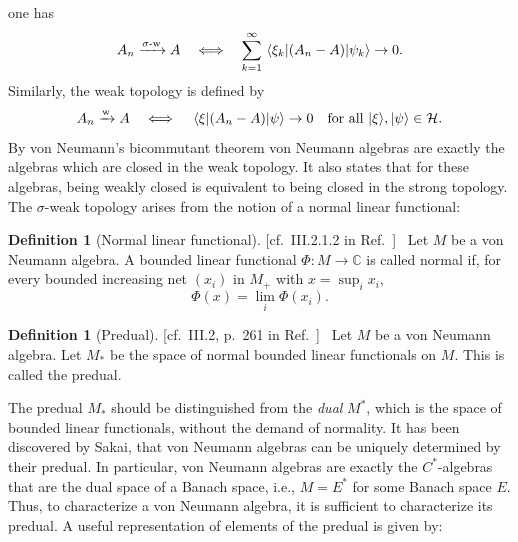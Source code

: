 \documentclass[aps,pra,reprint,superscriptaddress]{revtex4-2}
\newcommand{\cH}{{\mathcal H}}
\renewcommand\P{\Phi}
\newcommand\s{\sigma}
\newcommand\x{\xi}
\newcommand\y{\psi}
\providecommand{\ket}[1]{\lvert #1\rangle}
\newcommand{\thmref}[1]{\textnormal{[#1]}\ }
\theoremstyle{definition}
\newtheorem{definition}[theorem]{Definition}
\theoremstyle{remark}
\begin{document}
    one has
    \begin{equation}
        A_n \xrightarrow{\sigma\text{-}\mathrm{w}} A
        \quad\Longleftrightarrow\quad
        \sum_{k=1}^{\infty}\mel{\x_k}{(A_n-A)}{\y_k}\to 0.
    \end{equation}
    Similarly, the weak topology is defined by
    \begin{equation}
        A_n \xrightarrow{\mathrm{w}} A
        \quad\Longleftrightarrow\quad
        \mel{\x}{(A_n-A)}{\y}\to 0
        \quad\text{for all }\ket{\x},\ket{\y}\in\cH.
    \end{equation}
    By von Neumann's bicommutant theorem \cite{TakesakiI,Sunder} von Neumann
    algebras are exactly the algebras which are closed in the weak topology. It
    also states that for these algebras, being weakly closed is equivalent to
    being closed in the strong topology. 
    The $\s$-weak topology arises from the notion of a normal linear functional:
\begin{definition}[Normal linear functional]
\thmref{cf.~III.2.1.2 in Ref.~\cite{Blackadar}}
Let $M$ be a von Neumann algebra. A bounded linear functional
$\P:M \rightarrow \mathbb{C}$ is called normal if, for every bounded increasing
net $(x_i)$ in $M_+$ with $x=\sup_i x_i$,
\begin{equation}
    \P(x) = \lim_i \P(x_i).
\end{equation}
\end{definition}
\begin{definition}[Predual]
\thmref{cf.~III.2, p.~261 in Ref.~\cite{Blackadar}}
Let $M$ be a von Neumann algebra. Let $M_*$ be the space of normal bounded linear
functionals on $M$. This is called the predual.
\end{definition}
The predual $M_\ast$ should be distinguished from the \emph{dual} $M^\ast$, which is the space of bounded linear functionals, without the demand of normality.
It has been discovered by Sakai, \cite{Sakai98} that von Neumann algebras can be
uniquely determined by their predual. In particular, von Neumann algebras are exactly the $C^\ast$-algebras that are the dual space of a Banach space, i.e., $M = E^\ast$ for some Banach space $E$. Thus, to characterize a von Neumann algebra, it is sufficient to characterize its predual. A useful representation of elements of the predual is given by:
\end{document}
